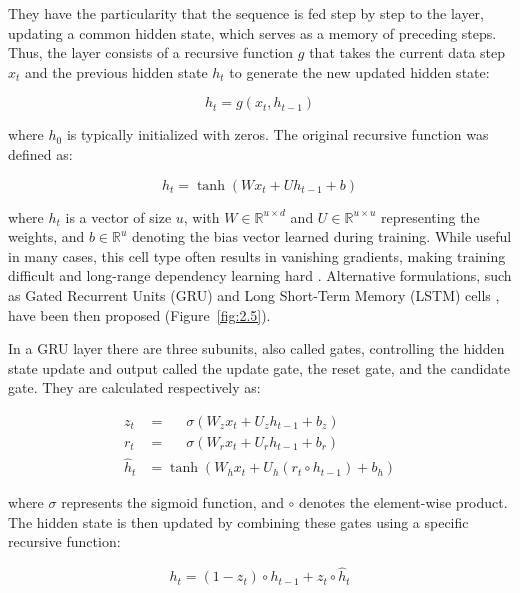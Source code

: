 They have the particularity that the sequence is fed step by step to the layer, updating a common hidden state, which serves as a memory of preceding steps. Thus, the layer consists of a recursive function $g$ that takes the current data step $x_t$ and the previous hidden state $h_t$ to generate the new updated hidden state:

\begin{equation}
h_t = g(x_t, h_{t-1})
\label{eq:2.8}
\end{equation}

\noindent where $h_0$ is typically initialized with zeros. The original recursive function was defined as:

\begin{equation}
h_t = \tanh(W x_t + U h_{t-1} + b)
\label{eq:2.9}
\end{equation}

\noindent where $h_t$ is a vector of size $u$, with $W \in \mathbb{R}^{u \times d}$ and $U \in \mathbb{R}^{u \times u}$ representing the weights, and $b \in \mathbb{R}^u$ denoting the bias vector learned during training. While useful in many cases, this cell type often results in vanishing gradients, making training difficult and long-range dependency learning hard \cite{Roberts2021TheTheory}. Alternative formulations, such as Gated Recurrent Units (GRU) and Long Short-Term Memory (LSTM) cells \cite{Cho2014LearningTranslation, Hochreiter1997LongMemory}, have been then proposed (Figure~\ref{fig:2.5}).

In a GRU layer there are three subunits, also called gates, controlling the hidden state update and output called the update gate, the reset gate, and the candidate gate. They are calculated respectively as:

\begin{align}
z_t &= \phantom{{}_tan} \sigma(W_z x_t + U_z h_{t-1} + b_z) \\
r_t &= \phantom{{}_tan} \sigma(W_r x_t + U_r h_{t-1} + b_r) \\
\hat{h}_t &= \tanh(W_h x_t + U_h (r_t \circ h_{t-1}) + b_h)
\label{eq:2.10-2.12}
\end{align}

\noindent where $\sigma$ represents the sigmoid function, and $\circ$ denotes the element-wise product. The hidden state is then updated by combining these gates using a specific recursive function:

\begin{equation}
h_t = (1 - z_t) \circ h_{t-1} + z_t \circ \hat{h}_t
\label{eq:2.13}
\end{equation}

